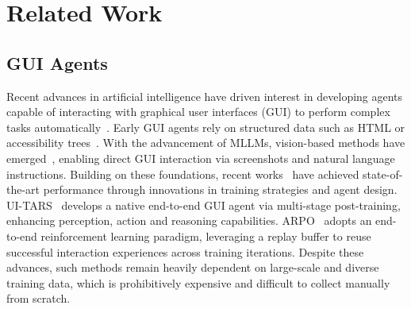 \documentclass{llmxive}
\begin{document}
\section{Related Work}
\subsection{GUI Agents}

Recent advances in artificial intelligence have driven  interest in developing agents capable of interacting with graphical user interfaces (GUI) to perform complex tasks automatically~\citep{qin2025ui, zhou2025mai}.
Early GUI agents rely on structured data such as HTML or accessibility trees~\citep{deng2023mind2web, gur2023real, yang2023set, he2024webvoyager, lai2024autowebglm}. With the advancement of MLLMs, vision-based methods have emerged~\citep{hong2024cogagent, zhang2024you, zhang2024android}, enabling direct GUI interaction via screenshots and natural language instructions.
Building on these foundations, recent works~\citep{qin2025ui, yan2025step, zeng2025uitron} have achieved state-of-the-art performance through innovations in training strategies and agent design. UI-TARS~\citep{qin2025ui} develops a native end-to-end GUI agent via multi-stage post-training, enhancing perception, action and reasoning capabilities. ARPO~\citep{lu2025arpo} adopts an end-to-end reinforcement learning paradigm, leveraging a replay buffer to reuse successful interaction experiences across training iterations. 
Despite these advances, such methods remain heavily dependent on large-scale and diverse training data, which is prohibitively expensive and difficult to collect manually from scratch.
\end{document}
